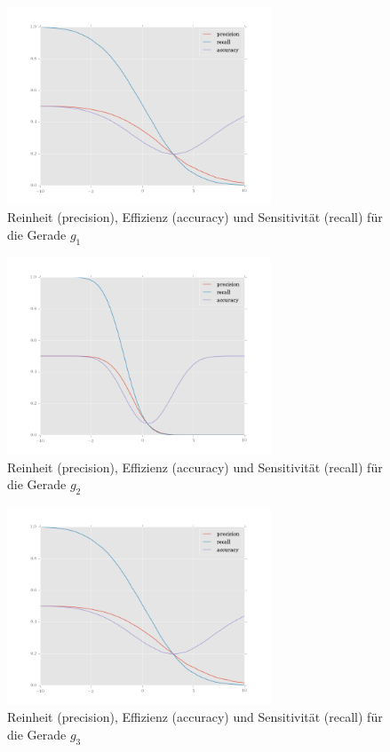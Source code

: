 \begin{figure}
	\centering
	\includegraphics[width=0.7\textwidth]{performace_g1.png}
	\caption{Reinheit (precision), Effizienz (accuracy) und Sensitivität (recall) für die Gerade $g_1$}
\end{figure}
\begin{figure}
	\centering
	\includegraphics[width=0.7\textwidth]{performace_g2.png}
	\caption{Reinheit (precision), Effizienz (accuracy) und Sensitivität (recall) für die Gerade $g_2$}
\end{figure}

\begin{figure}
	\centering
	\includegraphics[width=0.7\textwidth]{performace_g1.png}
	\caption{Reinheit (precision), Effizienz (accuracy) und Sensitivität (recall) für die Gerade $g_3$}
\end{figure}




